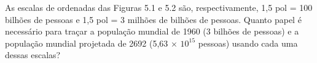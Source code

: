 As escalas de ordenadas das Figuras 5.1 e 5.2 são, respectivamente, 1,5 pol = 100 bilhões de pessoas e 1,5 pol = 3 milhões de bilhões de pessoas. Quanto papel é necessário para traçar a população mundial de 1960 (3 bilhões de pessoas) e a população mundial projetada de 2692 (5,63 × $10^{15}$ pessoas) usando cada uma dessas escalas?
